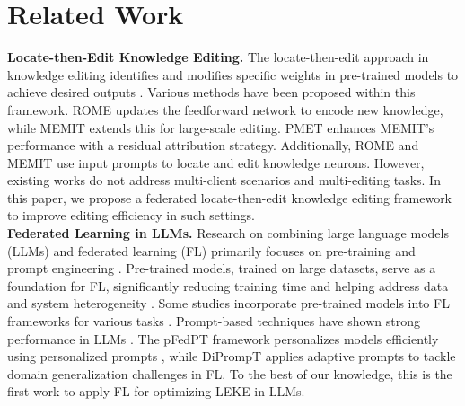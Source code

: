 \section{Related Work}
\textbf{Locate-then-Edit Knowledge Editing.} 
The locate-then-edit approach in knowledge editing identifies and modifies specific weights in pre-trained models to achieve desired outputs \cite{locate-then-edit-1, locate-then-edit-2}. Various methods have been proposed within this framework. ROME \cite{ROME} updates the feedforward network to encode new knowledge, while MEMIT \cite{MEIMT} extends this for large-scale editing. PMET \cite{PMET} enhances MEMIT’s performance with a residual attribution strategy. Additionally, ROME \cite{ROME} and MEMIT \cite{MEIMT} use input prompts to locate and edit knowledge neurons. However, existing works do not address multi-client scenarios and multi-editing tasks. In this paper, we propose a federated locate-then-edit knowledge editing framework to improve editing efficiency in such settings. \\
\textbf{Federated Learning in LLMs.}
Research on combining large language models (LLMs) and federated learning (FL) primarily focuses on pre-training and prompt engineering \cite{fl-llm}. Pre-trained models, trained on large datasets, serve as a foundation for FL, significantly reducing training time \cite{fl-llm-time1, fl-llm-time2} and helping address data and system heterogeneity \cite{fl-llm-non-iid}. Some studies incorporate pre-trained models into FL frameworks for various tasks \cite{pre-fl1, pre-fl2}. Prompt-based techniques have shown strong performance in LLMs \cite{promptfl}. The pFedPT framework personalizes models efficiently using personalized prompts \cite{personlization}, while DiPrompT \cite{DiPrompT} applies adaptive prompts to tackle domain generalization challenges in FL. To the best of our knowledge, this is the first work to apply FL for optimizing LEKE in LLMs.